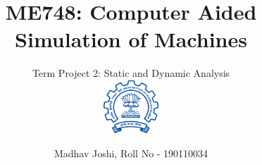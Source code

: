 \sectionfont{\large\sf\bfseries\color{black!60!blue}} 
\subsectionfont{\normalsize\sf\bfseries}

\title{ME748: Computer Aided Simulation of Machines}

\subtitle{Term Project 2: Static and Dynamic Analysis \\
\hfill\includegraphics[height=2cm]{Images/Indian_Institute_of_Technology_Bombay_Logo.png}
\vspace{-2cm}}

\author{Madhav Joshi, Roll No - 190110034} 

